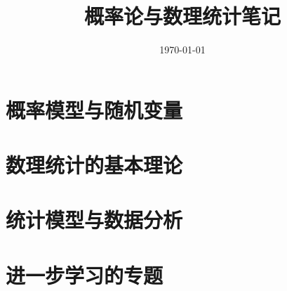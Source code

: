 \documentclass[UTF8,12pt,a4paper,fontset=fandol]{ctexbook}
\title{概率论与数理统计笔记}
\author{}
\date{\today}
\begin{document}
\frontmatter %


\maketitle
\tableofcontents
\clearpage


\mainmatter

\part{概率模型与随机变量}










\part{数理统计的基本理论}







\part{统计模型与数据分析}



\part{进一步学习的专题}




\appendix



\end{document}

